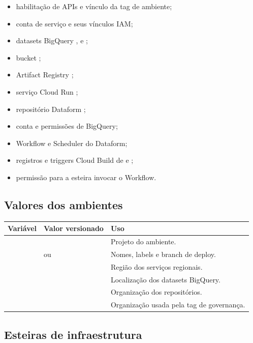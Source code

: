 \documentclass[11pt,a4paper]{article}
\begin{document}
\begin{itemize}
  \item habilitação de APIs e vínculo da tag de ambiente;
  \item conta de serviço  e seus vínculos IAM;
  \item datasets BigQuery ,  e ;
  \item bucket ;
  \item Artifact Registry ;
  \item serviço Cloud Run ;
  \item repositório Dataform ;
  \item conta  e permissões de BigQuery;
  \item Workflow e Scheduler do Dataform;
  \item registros e triggers Cloud Build de  e
  ;
  \item permissão para a esteira invocar o Workflow.
\end{itemize}

\subsection{Valores dos ambientes}

\begin{tabularx}{\textwidth}{L{34mm}L{47mm}Y}
\toprule
\textbf{Variável} & \textbf{Valor versionado} & \textbf{Uso} \\
\midrule
{} &  & Projeto do ambiente. \\
 &  ou  & Nomes, labels e branch de deploy. \\
 &  & Região dos serviços regionais. \\
 &  & Localização dos datasets BigQuery. \\
 &  & Organização dos repositórios. \\
 &  & Organização usada pela tag de governança. \\
\bottomrule
\end{tabularx}

\subsection{Esteiras de infraestrutura}
\end{document}
